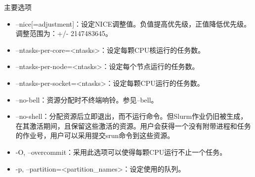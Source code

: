 \begin{frame}{主要选项}
\begin{itemize}
%
%
%
   \item --nice[=adjustment]：设定NICE调整值。负值提高优先级，正值降低优先级。调整范围为：+/- 2147483645。
   \item --ntasks-per-core=<ntasks>：设定每颗CPU核运行的任务数。
   \item --ntasks-per-node=<ntasks>：设定每个节点运行的任务数。
   \item --ntasks-per-socket=<ntasks>：设定每颗CPU运行的任务数。
   \item --no-bell：资源分配时不终端响铃。参见--bell。
   \item --no-shell：分配资源后立即退出，而不运行命令。但Slurm作业仍旧被生成，在其激活期间，且保留这些激活的资源。用户会获得一个没有附带进程和任务的作业号，用户可以采用提交srun命令到这些资源。
   \item -O, --overcommit：采用此选项可以使得每颗CPU运行不止一个任务。
   \item -p, --partition=<partition\_names>：设定使用的队列。

%
%
%
%
%
%
%


\end{itemize}
\end{frame}
